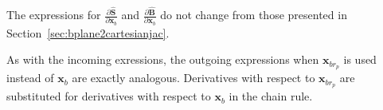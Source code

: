 \documentclass[]{article}
\newcommand{\vb}[1]{\bm{#1}} %
\newcommand{\vbh}[1]{\hat{\bm{#1}}} %
\newcommand{\pd}[2]{\frac{\partial #1}{\partial #2}} %
\newcommand{\xb}[0]{\vb{x}_b}
\newcommand{\xbrp}[0]{\vb{x}_{br_p}}
\begin{document}
\noindent The expressions for $\pd{\vbh{S}}{\xb}$ and $\pd{\vbh{B}}{\xb}$ do not change from those presented in Section~\ref{sec:bplane2cartesianjac}.

As with the incoming exressions, the outgoing expressions when $\xbrp$ is used instead of $\xb$ are exactly analogous. Derivatives with respect to $\xbrp$ are substituted for derivatives with respect to $\xb$ in the chain rule.

%
%
\end{document}
